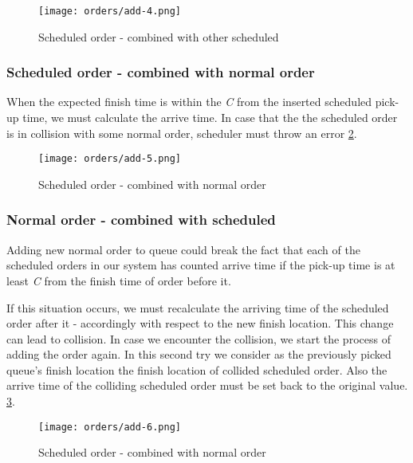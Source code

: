 			\begin{figure}[h]\centering
				\texttt{[image: orders/add-4.png]}
				\caption{Scheduled order - combined with other scheduled} 
				\label{order-process-scheduled-order-combined-with-scheduled}
			\end{figure} 
		
	\subsubsection{Scheduled order - combined with normal order}
		When the expected finish time is within the \textit{C} from the inserted scheduled pick-up time, we must calculate the arrive time. In case that the the scheduled order is in collision with some normal order, scheduler must throw an error \ref{order-process-scheduled-order-combined-with-normal}.
		 
		\begin{figure}[h]\centering
			\texttt{[image: orders/add-5.png]}
			\caption{Scheduled order - combined with normal order} 
			\label{order-process-scheduled-order-combined-with-normal}
		\end{figure} 
	
			
	\subsubsection{Normal order - combined with scheduled}
	Adding new normal order to queue could break the fact that each of the scheduled orders in our system has counted arrive time if the pick-up time is at least \textit{C} from the finish time of order before it.
	
	If this situation occurs, we must recalculate the arriving time of the scheduled order after it -  accordingly with respect to the new finish location. This change can lead to collision. In case we encounter the collision, we start the process of adding the order again. In this second try we consider as the previously picked queue's finish location the finish location of collided scheduled order. Also the arrive time of the colliding scheduled order must be set back to the original value. 
	 \ref{order-process-normal-order-combined-with-scheduled}.
	
	\begin{figure}[h]\centering
		\texttt{[image: orders/add-6.png]}
		\caption{Scheduled order - combined with normal order} 
		\label{order-process-normal-order-combined-with-scheduled}
	\end{figure} 

